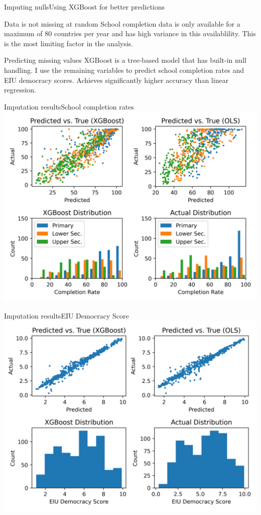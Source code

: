 \documentclass[10pt]{beamer}
\begin{document}
\begin{frame}{Imputing nulls}{Using XGBoost for better predictions}
    \begin{block}{Data is not missing at random}
        School completion data is only available for a maximum of 80 countries per year and has high variance in this availablility.
        This is the most limiting factor in the analysis.
    \end{block}

    \begin{block}{Predicting missing values}
        XGBoost is a tree-based model that has built-in null handling. I use the remaining variables to predict school completion rates and EIU democracy scores.
        Achieves significantly higher accuracy than linear regression.
    \end{block}
    
\end{frame}

\begin{frame}{Imputation results}{School completion rates}
    \centering
    \includegraphics[width=\textwidth]{../build/xgboost.png}
\end{frame}

\begin{frame}{Imputation results}{EIU Democracy Score}
    \centering
    \includegraphics[width=\textwidth]{../build/eiu_xgboost.png}
\end{frame}
\end{document}
